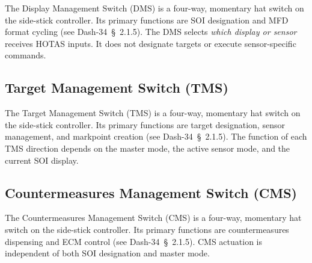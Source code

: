 \documentclass[11pt, a4paper, twoside]{report}
\newcommand{\dashref}[1]{Dash-34~\S~#1}
\begin{document}
The Display Management Switch (DMS) is a four-way, momentary hat switch on the side-stick controller. Its primary functions are SOI designation and MFD format cycling (see \dashref{2.1.5}). The DMS selects \textit{which display or sensor} receives HOTAS inputs. It does not designate targets or execute sensor-specific commands.

\subsection{Target Management Switch (TMS)}
\label{sec:C2-S3-S2}

The Target Management Switch (TMS) is a four-way, momentary hat switch on the side-stick controller. Its primary functions are target designation, sensor management, and markpoint creation (see \dashref{2.1.5}). The function of each TMS direction depends on the master mode, the active sensor mode, and the current SOI display.

\subsection{Countermeasures Management Switch (CMS)}
\label{sec:C2-S3-S3}

The Countermeasures Management Switch (CMS) is a four-way, momentary hat switch on the side-stick controller. Its primary functions are countermeasures dispensing and ECM control (see \dashref{2.1.5}). CMS actuation is independent of both SOI designation and master mode.

\end{document}

